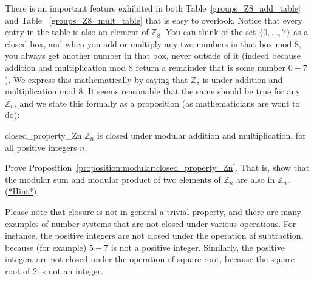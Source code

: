 
There is an important feature exhibited in both Table~\ref{groups_Z8_add_table} and Table ~\ref{groups_Z8_mult_table} that is easy to overlook.
Notice that every entry in the table is also an element of ${\mathbb Z}_8$. You can think of the set $\{0,...,7\}$ as a closed box, and when you add or multiply any two numbers in that box mod $8$, you always get another number in that box, never outside of it (indeed because addition and multiplication mod $8$ return a remainder that is some number $0-7$). We express this mathematically by saying that ${\mathbb Z}_8$ is   under addition and multiplication mod $8$. It seems reasonable that the same should be true for any ${\mathbb Z}_n$, and we state this formally as a proposition (as mathematicians are wont to do):



 \begin{prop}{closed_property_Zn}
${\mathbb Z}_n$ is closed under modular addition and multiplication, for all positive integers $n$.
\end{prop}

\begin{exercise}{52}
Prove Proposition~\ref{proposition:modular:closed_property_Zn}. That is, show that the modular sum and modular product of two elements of  ${\mathbb Z}_n$ are also in ${\mathbb Z}_n$.
\hyperref[sec:modular_arithmetic:hints]{(*Hint*)}
\end{exercise}
Please note that closure is not in general a trivial property, and there are many examples of number systems that are not closed under various operations. For instance, the positive integers are not closed under the operation of subtraction, because (for example) $5 - 7$ is not a positive integer. Similarly, the positive integers are not closed under the operation of square root, because the square root of 2 is not an integer.

